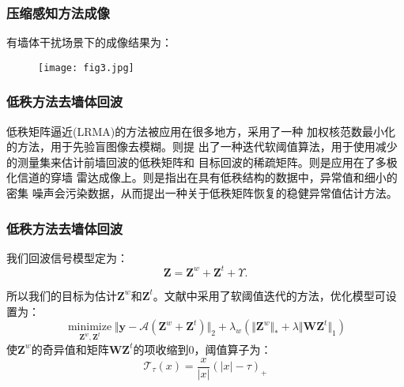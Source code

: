 \documentclass[12pt]{beamer}
\begin{document}
\begin{frame}
  \frametitle{压缩感知方法成像}
  有墙体干扰场景下的成像结果为：
  \begin{figure}
  \centering
  \texttt{[image: fig3.jpg]}
  \end{figure}
\end{frame}
\begin{frame}
  \frametitle{低秩方法去墙体回波}
  低秩矩阵逼近(LRMA)的方法被应用在很多地方，\citep{Ren2016Image}采用了一种
  加权核范数最小化的方法，用于先验盲图像去模糊。\citep{Tang2016Radar}则提
  出了一种迭代软阈值算法，用于使用减少的测量集来估计前墙回波的低秩矩阵和
  目标回波的稀疏矩阵。\citep{Bouzerdoum2017A}则是应用在了多极化信道的穿墙
  雷达成像上。\citep{Guo2018Low}则是指出在具有低秩结构的数据中，异常值和细小的密集
  噪声会污染数据，从而提出一种关于低秩矩阵恢复的稳健异常值估计方法。
\end{frame}
\begin{frame}
  \frametitle{低秩方法去墙体回波}
我们回波信号模型定为：
  \begin{equation} 
	\mathbf{Z}=\mathbf Z^{w}+\mathbf{Z}^{t}+\Upsilon.
  \end{equation}
  \par 所以我们的目标为估计$\mathbf{Z}^w$和$\mathbf{Z}^{t}$。文献\citep{Tang2016Radar}中采用了软阈值迭代的方法，优化模型可设置为：
\begin{equation}
\mathop\text{minimize}\limits_{\mathbf{Z}^{w},\mathbf{Z}^{t}} \Vert \mathbf{y}-\mathcal{A}(\mathbf{Z}^{w}+\mathbf{Z}^{t})\Vert_{2}+\lambda_{w}(\Vert \mathbf{Z}^{w}\Vert_{*}+\lambda\Vert \mathbf{WZ}^{t}\Vert_{1})
  \end{equation}
 使$\mathbf{Z}^w$的奇异值和矩阵$\mathbf{WZ}^t$的项收缩到0，阈值算子为：
  \begin{equation*}
	\mathcal{T}_{\tau}(x)=\frac{x}{\vert x\vert }(\vert x\vert -\tau)_{+}
  \end{equation*} 
\end{frame}
\end{document}

